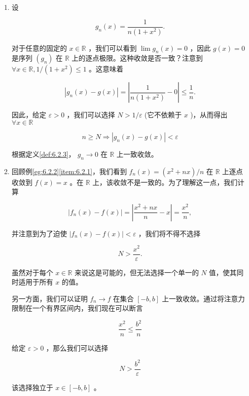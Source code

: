 \begin{Eg}\label{eg:6.2.4}
  \begin{enumerate}[label = (\roman*)]
  \item\label{item:6.2.4} 设

\[
{g}_{n}\left( x\right)  = \frac{1}{n\left( {1 + {x}^{2}}\right) }.
\]

对于任意的固定的 \(x \in  \mathbb{R}\) ，我们可以看到 \(\lim {g}_{n}\left( x\right)  = 0\) ，因此 \(g\left( x\right)  = 0\) 是序列 \(\left( {g}_{n}\right)\) 在 \(\mathbb{R}\) 上的逐点极限。这种收敛是否一致？注意到 \( \forall x \in  \mathbb{R}, 1/\left( {1 + {x}^{2}}\right)  \leq  1\) 。这意味着

\[
\left| {{g}_{n}\left( x\right)  - g\left( x\right) }\right|  = \left| {\frac{1}{n\left( {1 + {x}^{2}}\right) } - 0}\right|  \leq  \frac{1}{n}.
\]

因此，给定 \(\varepsilon  > 0\) ，我们可以选择 \(N > 1/\varepsilon\) (它不依赖于 \(x\) )，从而得出 $\forall x\in \mathbb{R}$

\[
n \geq  N\Rightarrow \left| {{g}_{n}\left( x\right)  - g\left( x\right) }\right|  < \varepsilon
\]

根据定义\ref{def:6.2.3}， \({g}_{n} \rightarrow  0\) 在 \(\mathbb{R}\) 上一致收敛。

  \item\label{item:6.2.5}回顾例\ref{eg:6.2.2}\ref{item:6.2.1}，我们看到 \({f}_{n}\left( x\right)  = \left( {{x}^{2} + {nx}}\right) /n\) 在 \(\mathbb{R}\) 上逐点收敛到 \(f\left( x\right)  = x\) 。在 \(\mathbb{R}\) 上，该收敛不是一致的。为了理解这一点，我们计算

\[
\left| {{f}_{n}\left( x\right)  - f\left( x\right) }\right|  = \left| {\frac{{x}^{2} + {nx}}{n} - x}\right|  = \frac{{x}^{2}}{n},
\]

并注意到为了迫使 \(\left| {{f}_{n}\left( x\right)  - f\left( x\right) }\right|  < \varepsilon\) ，我们将不得不选择

\[
N > \frac{{x}^{2}}{\varepsilon }.
\]

虽然对于每个 \(x \in  \mathbb{R}\) 来说这是可能的，但无法选择一个单一的 \(N\) 值，使其同时适用于所有 \(x\) 的值。

另一方面，我们可以证明 \({f}_{n} \rightarrow  f\) 在集合 \(\left\lbrack  {-b,b}\right\rbrack\) 上一致收敛。通过将注意力限制在一个有界区间内，我们现在可以断言

\[
\frac{{x}^{2}}{n} \leq  \frac{{b}^{2}}{n}
\]


给定 \(\varepsilon  > 0\) ，那么我们可以选择

\[
N > \frac{{b}^{2}}{\varepsilon }
\]

该选择独立于 \(x \in  \left\lbrack  {-b,b}\right\rbrack\) 。

  \end{enumerate}
\end{Eg}



